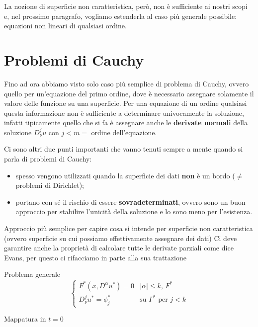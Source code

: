 La nozione di superficie non caratteristica, però, non è sufficiente ai nostri scopi e, nel prossimo paragrafo, vogliamo estenderla al caso più generale possibile: equazioni non lineari di qualsiasi ordine.

\newpage
\section{Problemi di Cauchy}

Fino ad ora abbiamo visto solo caso più semplice di problema di Cauchy, ovvero quello per un'equazione del primo ordine, dove è necessario assegnare solamente il valore delle funzione su una superficie. Per una equazione di un ordine qualsiasi questa informazione non è sufficiente a determinare univocamente la soluzione, infatti tipicamente quello che si fa è assegnare anche le \textbf{derivate normali} della soluzione $D^j_\nu u$ con $j<m=$ ordine dell'equazione. 

Ci sono altri due punti importanti che vanno tenuti sempre a mente quando si parla di problemi di Cauchy:
\begin{itemize}
\item spesso vengono utilizzati quando la superficie dei dati \textbf{non} è un bordo ($\neq$ problemi di Dirichlet);
\item portano con sé il rischio di essere \textbf{sovradeterminati}, ovvero sono un buon approccio per stabilire l'unicità della soluzione e lo sono meno per l'esistenza.
\end{itemize}
Approccio più semplice per capire cosa si intende per superficie non caratteristica (ovvero superficie su cui possiamo effettivamente assegnare dei dati)
Ci deve garantire anche la proprietà di calcolare tutte le derivate parziali come dice Evans, per questo ci rifacciamo in parte alla sua trattazione 

Problema generale
\begin{equation*}
\begin{cases}
F^*(x,D^\alpha u^*)=0 & |\alpha | \leq k, \, F^*\\
D^j_\nu u^* = \phi_j^* & \text{su } \Gamma^* \text{ per }j<k 
\end{cases}
\end{equation*}



Mappatura in $t=0$

